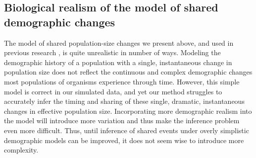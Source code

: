 

\subsection{Biological realism of the model of shared demographic changes}
The model of shared population-size changes we present above, and used in
previous research \citep{Chan2014,Xue2015,Gehara2017,Xue2015}, is quite
unrealistic in number of ways.
Modeling the demographic history of a population with a single,
instantaneous change in population size does not reflect the continuous and
complex demographic changes most populations of organisms experience through
time.
However, this simple model is correct in our simulated data, and yet our method
struggles to accurately infer the timing and sharing of these single, dramatic,
instantaneous changes in effective population size.
Incorporating more demographic realism into the model will introduce more
variation and thus make the inference problem even more difficult.
Thus, until inference of shared events under overly simplistic demographic
models can be improved, it does not seem wise to introduce more complexity.

